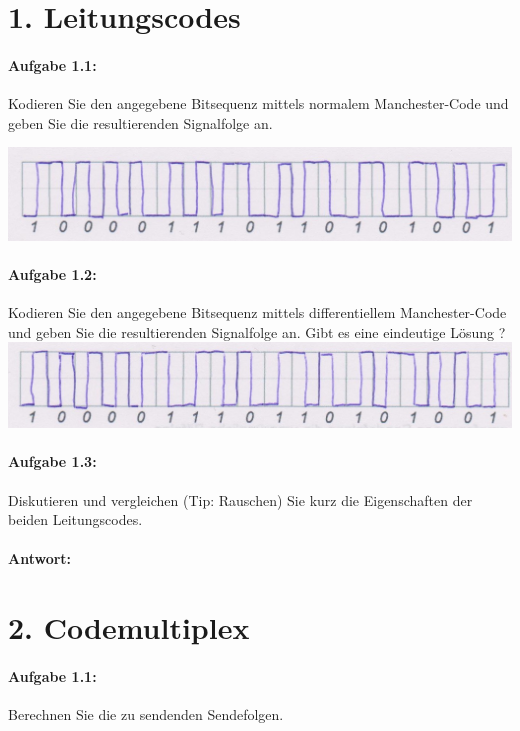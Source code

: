 \section{1. Leitungscodes}
\paragraph{Aufgabe 1.1:}
	Kodieren Sie den angegebene Bitsequenz mittels normalem Manchester-Code und geben Sie die resultierenden Signalfolge an.

\includegraphics[scale=0.2]{blatt3_1_1}
\paragraph{Aufgabe 1.2:}
	Kodieren Sie den angegebene Bitsequenz mittels differentiellem Manchester-Code und geben Sie die resultierenden Signalfolge an. Gibt es eine eindeutige Lösung ?
\includegraphics[scale=0.2]{blatt3_1_2}

\paragraph{Aufgabe 1.3:}
	Diskutieren und vergleichen (Tip: Rauschen) Sie kurz die Eigenschaften der beiden Leitungscodes.
\paragraph{Antwort:}
\section{2. Codemultiplex}
\paragraph{Aufgabe 1.1:}
	Berechnen Sie die zu sendenden Sendefolgen.

